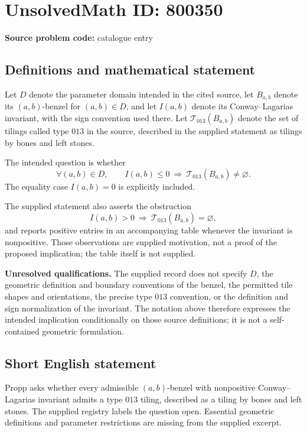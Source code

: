 \documentclass[11pt]{article}
\begin{document}
\section*{UnsolvedMath ID: 800350}
\textbf{Source problem code:} catalogue entry
\subsection{Definitions and mathematical statement}
Let \(D\) denote the parameter domain intended in the cited source, let \(B_{a,b}\) denote its \((a,b)\)-benzel for \((a,b)\in D\), and let \(I(a,b)\) denote its Conway--Lagarias invariant, with the sign convention used there. Let \(\mathcal T_{013}(B_{a,b})\) denote the set of tilings called type \(013\) in the source, described in the supplied statement as tilings by bones and left stones.

The intended question is whether
\[
\forall (a,b)\in D,\qquad I(a,b)\leq 0\ \Longrightarrow\ \mathcal T_{013}(B_{a,b})\neq\varnothing.
\]
The equality case \(I(a,b)=0\) is explicitly included.

The supplied statement also asserts the obstruction
\[
I(a,b)>0\ \Longrightarrow\ \mathcal T_{013}(B_{a,b})=\varnothing,
\]
and reports positive entries in an accompanying table whenever the invariant is nonpositive. Those observations are supplied motivation, not a proof of the proposed implication; the table itself is not supplied.

\textbf{Unresolved qualifications.} The supplied record does not specify \(D\), the geometric definition and boundary conventions of the benzel, the permitted tile shapes and orientations, the precise type \(013\) convention, or the definition and sign normalization of the invariant. The notation above therefore expresses the intended implication conditionally on those source definitions; it is not a self-contained geometric formulation.
\subsection{Short English statement}
Propp asks whether every admissible \((a,b)\)-benzel with nonpositive Conway--Lagarias invariant admits a type \(013\) tiling, described as a tiling by bones and left stones. The supplied registry labels the question open. Essential geometric definitions and parameter restrictions are missing from the supplied excerpt.
\end{document}
